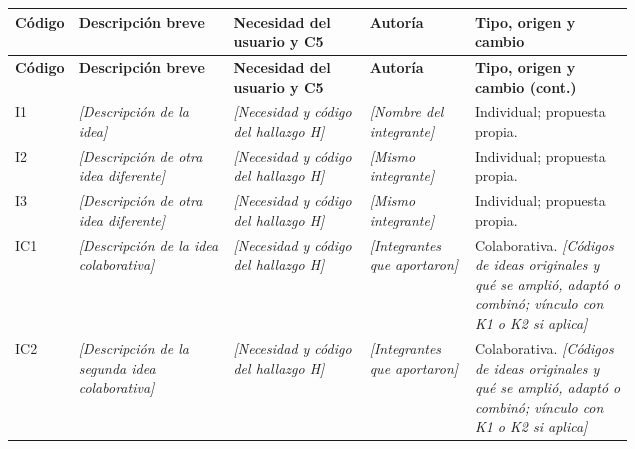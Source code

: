\documentclass[12pt,a4paper]{article}
\newcommand{\campo}[1]{\textcolor{InstructionColor}{\textit{[#1]}}}
\begin{document}
{\small
\begin{longtable}{|P{0.08\linewidth}|P{0.25\linewidth}|P{0.22\linewidth}|P{0.17\linewidth}|P{\arrayrulewidth\relax}|}
\hline
\textbf{Código} & \textbf{Descripción breve} & \textbf{Necesidad del usuario y C5} & \textbf{Autoría} & \textbf{Tipo, origen y cambio} \\\hline
\endfirsthead
\hline
\textbf{Código} & \textbf{Descripción breve} & \textbf{Necesidad del usuario y C5} & \textbf{Autoría} & \textbf{Tipo, origen y cambio (cont.)} \\\hline
\endhead
I1 & \campo{Descripción de la idea} & \campo{Necesidad y código del hallazgo H} & \campo{Nombre del integrante} & Individual; propuesta propia. \\\hline
I2 & \campo{Descripción de otra idea diferente} & \campo{Necesidad y código del hallazgo H} & \campo{Mismo integrante} & Individual; propuesta propia. \\\hline
I3 & \campo{Descripción de otra idea diferente} & \campo{Necesidad y código del hallazgo H} & \campo{Mismo integrante} & Individual; propuesta propia. \\\hline
IC1 & \campo{Descripción de la idea colaborativa} & \campo{Necesidad y código del hallazgo H} & \campo{Integrantes que aportaron} & Colaborativa. \campo{Códigos de ideas originales y qué se amplió, adaptó o combinó; vínculo con K1 o K2 si aplica} \\\hline
IC2 & \campo{Descripción de la segunda idea colaborativa} & \campo{Necesidad y código del hallazgo H} & \campo{Integrantes que aportaron} & Colaborativa. \campo{Códigos de ideas originales y qué se amplió, adaptó o combinó; vínculo con K1 o K2 si aplica} \\\hline
\end{longtable}
}
\end{document}
